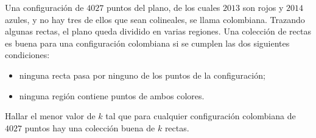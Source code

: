 Una configuración de $4027$ puntos del plano, de los cuales $2013$ son rojos y $2014$ azules, y no hay tres de ellos que sean colineales, se llama colombiana. Trazando algunas rectas, el plano queda dividido en varias regiones. Una colección de rectas es buena para una configuración colombiana si se cumplen las dos siguientes condiciones: 
\begin{itemize}
\item ninguna recta pasa por ninguno de los puntos de la configuración;
\item ninguna región contiene puntos de ambos colores. 
\end{itemize}
Hallar el menor valor de $k$ tal que para cualquier configuración colombiana de $4027$ puntos hay una colección buena de $k$ rectas.